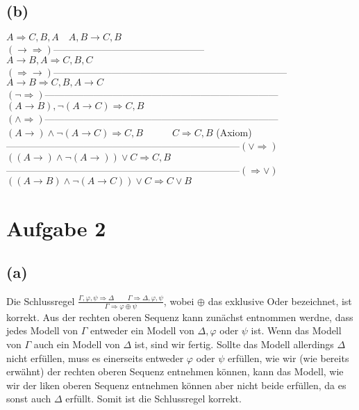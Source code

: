 \documentclass[11pt, a4paper]{article}
\renewcommand{\v}{\vee}
\newcommand{\n}{\wedge}
\begin{document}
\subsection*{(b)}
$A \Rightarrow C, B, A \quad A, B \rightarrow C, B$\\
$(\rightarrow \Rightarrow)$-----------------------------------------------\\
$A \rightarrow B, A \Rightarrow C, B, C$ \\
$(\Rightarrow \rightarrow)$------------------------------------------------------------------------\\
$A \rightarrow B \Rightarrow C,B,A \rightarrow C$\\
$(\neg \Rightarrow)$------------------------------------------------------------------------\\
$(A \rightarrow B), \neg(A \rightarrow C) \Rightarrow C,B$\\
$(\n \Rightarrow)$------------------------------------------------------------------------\\
$(A \rightarrow) \n \neg (A \rightarrow C) \Rightarrow C,B \quad\qquad C \Rightarrow C,B$ (Axiom) \\
------------------------------------------------------------------------$(\v \Rightarrow)$\\
$((A \rightarrow) \n \neg (A \rightarrow)) \v C \Rightarrow C, B$\\
------------------------------------------------------------------------$(\Rightarrow \v)$\\
$((A \rightarrow B) \n \neg (A \rightarrow C)) \v C \Rightarrow C \v B$\\

\section*{Aufgabe 2}
\subsection*{(a)}
Die Schlussregel $\frac{\Gamma, \varphi, \psi \Rightarrow \Delta \qquad \Gamma \Rightarrow \Delta, \varphi, \psi}{\Gamma \Rightarrow \varphi \oplus \psi}$, wobei $\oplus$ das exklusive Oder bezeichnet, ist korrekt.
Aus der rechten oberen Sequenz kann zunächst entnommen werdne, dass jedes Modell von $\Gamma$ entweder ein Modell von $\Delta, \varphi$ oder $\psi$ ist.
Wenn das Modell von $\Gamma$ auch ein Modell von $\Delta$ ist, sind wir fertig.
Sollte das Modell allerdings $\Delta$ nicht erfüllen, muss es einerseits entweder $\varphi$ oder $\psi$ erfüllen, wie wir (wie bereits erwähnt) der rechten oberen Sequenz entnehmen können, kann das Modell, wie wir der liken oberen Sequenz entnehmen können aber nicht beide erfüllen, da es sonst auch $\Delta$ erfüllt.
Somit ist die Schlussregel korrekt.
\end{document}
